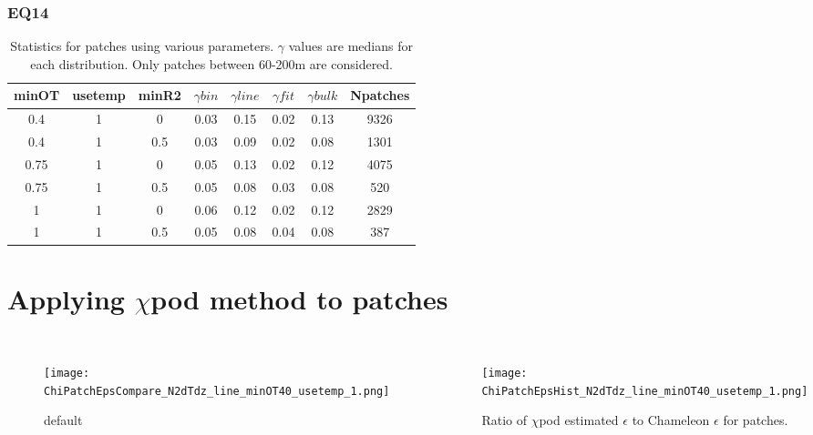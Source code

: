 \documentclass{beamer}
\begin{document}
\begin{frame}
 \frametitle{ EQ14 }

\begin{table}[htdp]
\caption{Statistics for patches using various parameters. $\gamma$ values are medians for each distribution. Only patches between 60-200m are considered.}
\begin{center}
\begin{tabular}{|c|c|c|c|c|c|c|c|}
\hline
minOT & usetemp & minR2 & $\gamma bin$ & $\gamma line$ & $\gamma fit$ & $\gamma bulk$ & Npatches \\
\hline
0.4 & 1 & 0 & 0.03 & 0.15 & 0.02 & 0.13 & 9326 \\
\hline
0.4 & 1 & 0.5 & 0.03 & 0.09 & 0.02 & 0.08 & 1301 \\
\hline
0.75 & 1 & 0 & 0.05 & 0.13 & 0.02 & 0.12 & 4075 \\
\hline
0.75 & 1 & 0.5 & 0.05 & 0.08 & 0.03 & 0.08 & 520 \\
\hline
1 & 1 & 0 & 0.06 & 0.12 & 0.02 & 0.12 & 2829 \\
\hline
1 & 1 & 0.5 & 0.05 & 0.08 & 0.04 & 0.08 & 387 \\
\hline
\hline
\hline
\end{tabular}
\end{center}
\label{tab}
\end{table}%


\end{frame}


\section{Applying $\chi$pod method to patches}

\begin{frame}
 \frametitle{ }
 
 
\begin{columns}


 \begin{figure}[htbp]
\begin{center}
\texttt{[image: ChiPatchEpsCompare\_N2dTdz\_line\_minOT40\_usetemp\_1.png]}
\caption{default}
\label{default}
\end{center}
\end{figure}


 \begin{figure}[htbp]
\begin{center}
\texttt{[image: ChiPatchEpsHist\_N2dTdz\_line\_minOT40\_usetemp\_1.png]}
\caption{Ratio of $\chi$pod estimated $\epsilon$ to Chameleon $\epsilon$ for patches.}
\label{default}
\end{center}
\end{figure}

\end{columns}

\end{frame}
\end{document}
